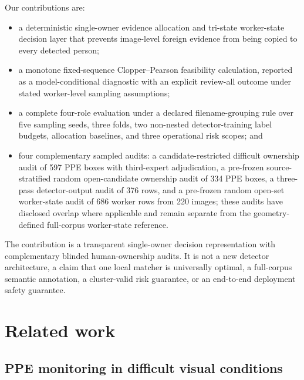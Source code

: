 \documentclass[iicol,pdflatex,sn-mathphys-num]{sn-jnl}
\begin{document}
Our contributions are:

\begin{itemize}
\item a deterministic single-owner evidence allocation and tri-state worker-state decision layer that prevents image-level foreign evidence from being copied to every detected person;
\item a monotone fixed-sequence Clopper--Pearson feasibility calculation, reported as a model-conditional diagnostic with an explicit review-all outcome under stated worker-level sampling assumptions;
\item a complete four-role evaluation under a declared filename-grouping rule over five sampling seeds, three folds, two non-nested detector-training label budgets, allocation baselines, and three operational risk scopes; and
\item four complementary sampled audits: a candidate-restricted difficult ownership audit of 597 PPE boxes with third-expert adjudication, a pre-frozen source-stratified random open-candidate ownership audit of 334 PPE boxes, a three-pass detector-output audit of 376 rows, and a pre-frozen random open-set worker-state audit of 686 worker rows from 220 images; these audits have disclosed overlap where applicable and remain separate from the geometry-defined full-corpus worker-state reference.
\end{itemize}

The contribution is a transparent single-owner decision representation with complementary blinded human-ownership audits. It is not a new detector architecture, a claim that one local matcher is universally optimal, a full-corpus semantic annotation, a cluster-valid risk guarantee, or an end-to-end deployment safety guarantee.

\section{Related work}\label{sec:related}

\subsection{PPE monitoring in difficult visual conditions}
\end{document}
